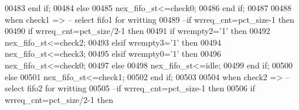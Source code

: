 \begin{DoxyCode}
00483               \textcolor{keywordflow}{end} \textcolor{keywordflow}{if};  
00484             \textcolor{keywordflow}{else}
00485               \textcolor{vhdlchar}{nex_fifo_st}\textcolor{vhdlchar}{<=}\textcolor{vhdlchar}{check0};
00486              \textcolor{keywordflow}{end} \textcolor{keywordflow}{if};
00487               
00488       \textcolor{keywordflow}{when} \textcolor{vhdlchar}{check1} \textcolor{vhdlchar}{=}\textcolor{vhdlchar}{>}\textcolor{keyword}{ -- select fifo1 for writting}
00489 \textcolor{keyword}{            --if wrreq\_cnt=pct\_size-1 then }
00490                 \textcolor{keywordflow}{if} \textcolor{vhdlchar}{wrreq_cnt}\textcolor{vhdlchar}{=}\textcolor{vhdlchar}{pct_size}\textcolor{vhdlchar}{/}\textcolor{vhdllogic}{2-1} \textcolor{keywordflow}{then}
00491               \textcolor{keywordflow}{if} \textcolor{vhdlchar}{wrempty2}\textcolor{vhdlchar}{=}\textcolor{vhdlchar}{'}\textcolor{vhdllogic}{}\textcolor{vhdllogic}{1}\textcolor{vhdlchar}{'} \textcolor{keywordflow}{then} 
00492                   \textcolor{vhdlchar}{nex_fifo_st}\textcolor{vhdlchar}{<=}\textcolor{vhdlchar}{check2};
00493                   \textcolor{keywordflow}{elsif} \textcolor{vhdlchar}{wrempty3}\textcolor{vhdlchar}{=}\textcolor{vhdlchar}{'}\textcolor{vhdllogic}{}\textcolor{vhdllogic}{1}\textcolor{vhdlchar}{'} \textcolor{keywordflow}{then} 
00494                   \textcolor{vhdlchar}{nex_fifo_st}\textcolor{vhdlchar}{<=}\textcolor{vhdlchar}{check3};  
00495               \textcolor{keywordflow}{elsif} \textcolor{vhdlchar}{wrempty0}\textcolor{vhdlchar}{=}\textcolor{vhdlchar}{'}\textcolor{vhdllogic}{}\textcolor{vhdllogic}{1}\textcolor{vhdlchar}{'} \textcolor{keywordflow}{then} 
00496                   \textcolor{vhdlchar}{nex_fifo_st}\textcolor{vhdlchar}{<=}\textcolor{vhdlchar}{check0};
00497               \textcolor{keywordflow}{else}
00498                  \textcolor{vhdlchar}{nex_fifo_st}\textcolor{vhdlchar}{<=}\textcolor{vhdlchar}{idle};
00499               \textcolor{keywordflow}{end} \textcolor{keywordflow}{if};
00500             \textcolor{keywordflow}{else}
00501               \textcolor{vhdlchar}{nex_fifo_st}\textcolor{vhdlchar}{<=}\textcolor{vhdlchar}{check1};
00502              \textcolor{keywordflow}{end} \textcolor{keywordflow}{if};
00503              
00504       \textcolor{keywordflow}{when} \textcolor{vhdlchar}{check2} \textcolor{vhdlchar}{=}\textcolor{vhdlchar}{>}\textcolor{keyword}{ -- select fifo2 for writting}
00505 \textcolor{keyword}{            --if wrreq\_cnt=pct\_size-1 then}
00506                 \textcolor{keywordflow}{if} \textcolor{vhdlchar}{wrreq_cnt}\textcolor{vhdlchar}{=}\textcolor{vhdlchar}{pct_size}\textcolor{vhdlchar}{/}\textcolor{vhdllogic}{2-1} \textcolor{keywordflow}{then}

\end{DoxyCode}
